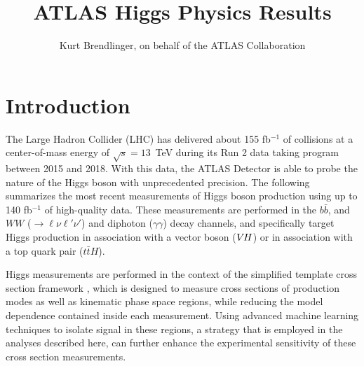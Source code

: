 \documentclass{moriond}
\def\vh{\texorpdfstring{\ensuremath{V\kern -0.1em H}\xspace}{VH\xspace}}
\begin{document}
\linenumbers

\vspace*{4cm}
\title{ATLAS Higgs Physics Results}

\author{ Kurt Brendlinger, on behalf of the ATLAS Collaboration }

\address{~\\DESY, Notkestra\ss e 85,\\ 22607 Hamburg, Germany}

\maketitle{}

\section{Introduction}

The Large Hadron Collider (LHC) \cite{Evans:2008zzb} has delivered about 155 fb$^{-1}$ of
collisions at a center-of-mass energy of $\sqrt{s}=13$~TeV during its Run 2 data taking program
between 2015 and 2018.
With this data, the
ATLAS Detector \cite{PERF-2007-01} is able to probe the nature of the Higgs boson with unprecedented
precision. The following summarizes the most recent measurements of Higgs boson production using up
to 140 fb$^{-1}$ of high-quality data. These measurements are performed in the $b\bar b$,
and $WW$ (${\rightarrow}\ell\nu\ell'\nu'$) and diphoton ($\gamma\gamma$) decay channels, and specifically
target Higgs production in association with a vector boson (\vh) or in association with a top
quark pair ($t\bar tH$).

Higgs measurements are performed in the context of the simplified template cross section
framework \cite{deFlorian:2016spz,Badger:2016bpw},
which is designed to measure cross sections of production modes as well as kinematic phase space
regions, while reducing the model dependence contained inside each measurement.
Using advanced machine learning techniques to isolate signal in these regions,
a strategy that is employed in the analyses described here, can further enhance the experimental
sensitivity of these cross section measurements.
\end{document}
